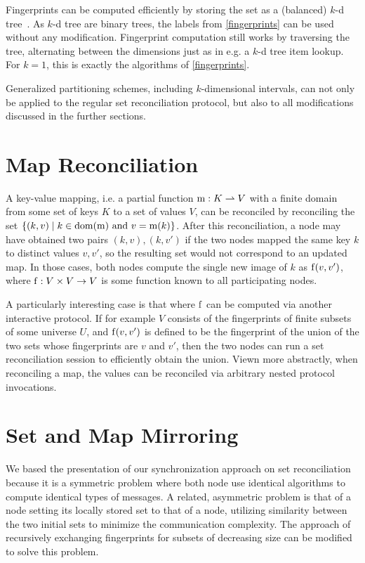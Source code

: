 Fingerprints can be computed efficiently by storing the set as a (balanced) $k$-d tree~\cite{bentley1975multidimensional}. As $k$-d tree are binary trees, the labels from \cref{fingerprints} can be used without any modification. Fingerprint computation still works by traversing the tree, alternating between the dimensions just as in e.g. a $k$-d tree item lookup. For $k = 1$, this is exactly the algorithms of \cref{fingerprints}.

Generalized partitioning schemes, including $k$-dimensional intervals, can not only be applied to the regular set reconciliation protocol, but also to all modifications discussed in the further sections.

\section{Map Reconciliation}
\label{maps}

A key-value mapping, i.e. a partial function ${\operatorname{m}}: {K} \rightharpoonup{V}$ with a finite domain from some set of keys $K$ to a set of values $V$, can be reconciled by reconciling the set $\{(k, v) \mid \text{$k \in \operatorname{dom}(\operatorname{m})$ and $v = \operatorname{m}(k)$}\}$. After this reconciliation, a node may have obtained two pairs $(k, v), (k, v')$ if the two nodes mapped the same key $k$ to distinct values $v, v'$, so the resulting set would not correspond to an updated map. In those cases, both nodes compute the single new image of $k$ as $\operatorname{f}(v, v')$, where ${\operatorname{f}}: {V \times V} \rightarrow {V}$ is some function known to all participating nodes.

A particularly interesting case is that where $\operatorname{f}$ can be computed via another interactive protocol. If for example $V$ consists of the fingerprints of finite subsets of some universe $U$, and $\operatorname{f}(v, v')$ is defined to be the fingerprint of the union of the two sets whose fingerprints are $v$ and $v'$, then the two nodes can run a set reconciliation session to efficiently obtain the union. Viewn more abstractly, when reconciling a map, the values can be reconciled via arbitrary nested protocol invocations.

\section{Set and Map Mirroring}
\label{set-mirror}

We based the presentation of our synchronization approach on set reconciliation because it is a symmetric problem where both node use identical algorithms to compute identical types of messages. A related, asymmetric problem is that of a  node setting its locally stored set to that of a  node, utilizing similarity between the two initial sets to minimize the communication complexity. The approach of recursively exchanging fingerprints for subsets of decreasing size can be modified to solve this  problem.

